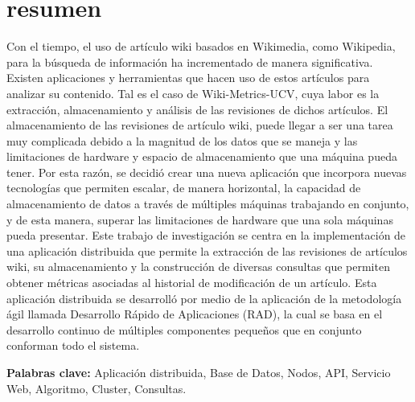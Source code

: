 \section*{resumen}

Con el tiempo, el uso de artículo wiki basados en Wikimedia,
como Wikipedia, para la búsqueda de información ha incrementado de
manera significativa.
Existen aplicaciones y herramientas que hacen uso de estos artículos
para analizar su contenido.
Tal es el caso de Wiki-Metrics-UCV, cuya labor es la extracción,
almacenamiento y análisis de las revisiones de dichos artículos.
El almacenamiento de las revisiones de artículo wiki,
puede llegar a ser una tarea muy complicada debido a la magnitud de los datos que se maneja y las limitaciones de hardware y espacio de almacenamiento que una máquina pueda tener.
Por esta razón, se decidió crear una nueva aplicación que incorpora
nuevas tecnologías que permiten escalar, de manera horizontal, la capacidad
de almacenamiento de datos a través de múltiples máquinas trabajando en conjunto, y de esta manera,
superar las limitaciones de hardware que una sola máquinas pueda presentar.
Este trabajo de investigación se centra en la implementación de una aplicación distribuida
que permite la extracción de las revisiones de artículos wiki, su almacenamiento y la
construcción de diversas consultas que permiten obtener métricas asociadas al historial
de modificación de un artículo.
Esta aplicación distribuida se desarrolló por medio de la aplicación de la metodología
ágil llamada Desarrollo Rápido de Aplicaciones (RAD), la cual se basa en el desarrollo
continuo de múltiples componentes pequeños que en conjunto conforman todo el sistema.

\textbf{Palabras clave:} Aplicación distribuida, Base de Datos, Nodos, API, Servicio Web, Algoritmo, Cluster, Consultas.
